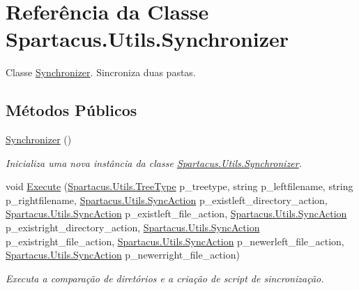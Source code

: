 \hypertarget{classSpartacus_1_1Utils_1_1Synchronizer}{\section{Referência da Classe Spartacus.\+Utils.\+Synchronizer}
\label{classSpartacus_1_1Utils_1_1Synchronizer}
}


Classe \hyperlink{classSpartacus_1_1Utils_1_1Synchronizer}{Synchronizer}. Sincroniza duas pastas.  


\subsection*{Métodos Públicos}
\begin{DoxyCompactItemize}
\item 
\hyperlink{classSpartacus_1_1Utils_1_1Synchronizer_ab2ecf07a457f700c24ab0043d80a9079}{Synchronizer} ()
\begin{DoxyCompactList}\small\item\em Inicializa uma nova instância da classe \hyperlink{classSpartacus_1_1Utils_1_1Synchronizer}{Spartacus.\+Utils.\+Synchronizer}. \end{DoxyCompactList}\item 
void \hyperlink{classSpartacus_1_1Utils_1_1Synchronizer_a8f56ebe8182239d7b3234eec66f9da06}{Execute} (\hyperlink{namespaceSpartacus_1_1Utils_ae4b47116ae1dc35f3dc3ea735874beee}{Spartacus.\+Utils.\+Tree\+Type} p\+\_\+treetype, string p\+\_\+leftfilename, string p\+\_\+rightfilename, \hyperlink{namespaceSpartacus_1_1Utils_a835f63b39808393d4b72d203056ae42e}{Spartacus.\+Utils.\+Sync\+Action} p\+\_\+existleft\+\_\+directory\+\_\+action, \hyperlink{namespaceSpartacus_1_1Utils_a835f63b39808393d4b72d203056ae42e}{Spartacus.\+Utils.\+Sync\+Action} p\+\_\+existleft\+\_\+file\+\_\+action, \hyperlink{namespaceSpartacus_1_1Utils_a835f63b39808393d4b72d203056ae42e}{Spartacus.\+Utils.\+Sync\+Action} p\+\_\+existright\+\_\+directory\+\_\+action, \hyperlink{namespaceSpartacus_1_1Utils_a835f63b39808393d4b72d203056ae42e}{Spartacus.\+Utils.\+Sync\+Action} p\+\_\+existright\+\_\+file\+\_\+action, \hyperlink{namespaceSpartacus_1_1Utils_a835f63b39808393d4b72d203056ae42e}{Spartacus.\+Utils.\+Sync\+Action} p\+\_\+newerleft\+\_\+file\+\_\+action, \hyperlink{namespaceSpartacus_1_1Utils_a835f63b39808393d4b72d203056ae42e}{Spartacus.\+Utils.\+Sync\+Action} p\+\_\+newerright\+\_\+file\+\_\+action)
\begin{DoxyCompactList}\small\item\em Executa a comparação de diretórios e a criação de script de sincronização. \end{DoxyCompactList}\end{DoxyCompactItemize}


